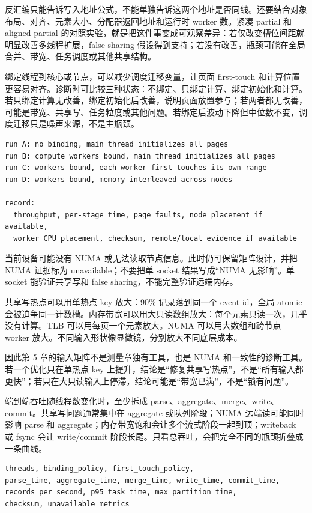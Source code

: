 反汇编只能告诉写入地址公式，不能单独告诉这两个地址是否同线。还要结合对象布局、对齐、元素大小、分配器返回地址和运行时 worker 数。紧凑 partial 和 aligned partial 的对照实验，就是把这件事变成可观察差异：若仅改变槽位间距就明显改善多线程扩展，false sharing 假设得到支持；若没有改善，瓶颈可能在全局合并、带宽、任务调度或其他共享结构。

绑定线程到核心或节点，可以减少调度迁移变量，让页面 first-touch 和计算位置更容易对齐。诊断时可比较三种状态：不绑定、只绑定计算、绑定初始化和计算。若只绑定计算无改善，绑定初始化后改善，说明页面放置参与；若两者都无改善，可能是带宽、共享写、任务粒度或其他问题。若绑定后波动下降但中位数不变，调度迁移只是噪声来源，不是主瓶颈。

\begin{lstlisting}[numbers=none,caption={NUMA 对照运行矩阵}]
run A: no binding, main thread initializes all pages
run B: compute workers bound, main thread initializes all pages
run C: workers bound, each worker first-touches its own range
run D: workers bound, memory interleaved across nodes

record:
  throughput, per-stage time, page faults, node placement if available,
  worker CPU placement, checksum, remote/local evidence if available
\end{lstlisting}

当前设备可能没有 NUMA 或无法读取节点信息。此时仍可保留矩阵设计，并把 NUMA 证据标为 unavailable；不要把单 socket 结果写成“NUMA 无影响”。单 socket 能验证共享写和 false sharing，不能完整验证远端内存。

共享写热点可以用单热点 key 放大：90\% 记录落到同一个 event id，全局 atomic 会被迫争同一计数槽。内存带宽可以用大只读数组放大：每个元素只读一次，几乎没有计算。TLB 可以用每页一个元素放大。NUMA 可以用大数组和跨节点 worker 放大。不同输入形状像显微镜，分别放大不同底层成本。

因此第 5 章的输入矩阵不是测量章独有工具，也是 NUMA 和一致性的诊断工具。若一个优化只在单热点 key 上提升，结论是“修复共享写热点”，不是“所有输入都更快”；若只在大只读输入上停滞，结论可能是“带宽已满”，不是“锁有问题”。

端到端吞吐随线程数变化时，至少拆成 parse、aggregate、merge、write、commit。共享写问题通常集中在 aggregate 或队列阶段；NUMA 远端读可能同时影响 parse 和 aggregate；内存带宽饱和会让多个流式阶段一起到顶；writeback 或 fsync 会让 write/commit 阶段长尾。只看总吞吐，会把完全不同的瓶颈折叠成一条曲线。

\begin{lstlisting}[numbers=none,caption={扩展曲线报告的最小字段}]
threads, binding_policy, first_touch_policy,
parse_time, aggregate_time, merge_time, write_time, commit_time,
records_per_second, p95_task_time, max_partition_time,
checksum, unavailable_metrics
\end{lstlisting}

